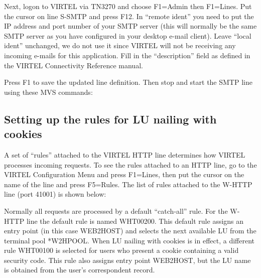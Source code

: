 \documentclass[letterpaper,10pt,english]{sphinxmanual}
\begin{document}
Next, logon to VIRTEL via TN3270 and choose F1=Admin then F1=Lines.  Put the cursor on line S-SMTP and press F12.  In “remote ident” you need to put the IP address and port number of your SMTP server (this will normally be the same SMTP server as you have configured in your desktop e-mail client).  Leave “local ident” unchanged, we do not use it since VIRTEL will not be receiving any incoming e-mails for this application.  Fill in the “description” field as defined in the VIRTEL Connectivity Reference manual.

Press F1 to save the updated line definition. Then stop and start the SMTP line using these MVS commands:

\begin{sphinxVerbatim}[commandchars=\\\{\}]
 
 
\end{sphinxVerbatim}


\subsection{Setting up the rules for LU nailing with cookies}
\label{\detokenize{connectivity_guide:setting-up-the-rules-for-lu-nailing-with-cookies}}
A set of “rules” attached to the VIRTEL HTTP line determines how VIRTEL processes incoming requests.  To see the rules attached to an HTTP line, go to the VIRTEL Configuration Menu and press F1=Lines, then put the cursor on the name of the line and press F5=Rules.  The list of rules attached to the W-HTTP line (port 41001) is shown below:



Normally all requests are processed by a default “catch-all” rule.  For the W-HTTP line the default rule is named WHT00200.  This default rule assigns an entry point (in this case WEB2HOST) and selects the next available LU from the terminal pool *W2HPOOL.  When LU nailing with cookies is in effect, a different rule WHT00100 is selected for users who present a cookie containing a valid security code.  This rule also assigns entry point WEB2HOST, but the LU name is obtained from the user’s correspondent record.

\end{document}
